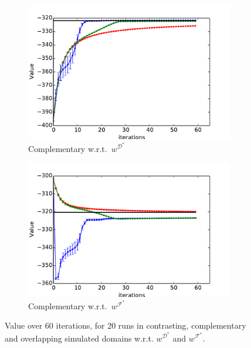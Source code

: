 \documentclass{aamas2016}
\begin{document}
\begin{figure}[t]
  \begin{subfigure}[b]{0.45\columnwidth}
    \includegraphics[trim=0.5cm 0.5cm 0.5cm 0,clip=true,width=\textwidth]{images/expert_apprentice_complementary.pdf}
    \caption{Complementary w.r.t.\ $w^{\mathcal{D}^*}$}
    \label{fig:toy_expert_apprentice_complementary}
  \end{subfigure}
  \hfill
  \begin{subfigure}[b]{0.45\columnwidth}
    \includegraphics[trim=0.5cm 0.5cm 0.5cm 0,clip=true,width=\textwidth]{images/taboo_apprentice_complementary.pdf}
    \caption{Complementary w.r.t.\ $w^{\mathcal{F}^*}$}
    \label{fig:toy_taboo_apprentice_complementary}
  \end{subfigure}  

  \caption{Value over 60 iterations, for 20 runs in contrasting, complementary and overlapping simulated domains w.r.t. $w^{\mathcal{D}^*}$ and $w^{\mathcal{F}^*}$.\ }
  \label{fig:complementary}

 

\end{figure}
\end{document}
